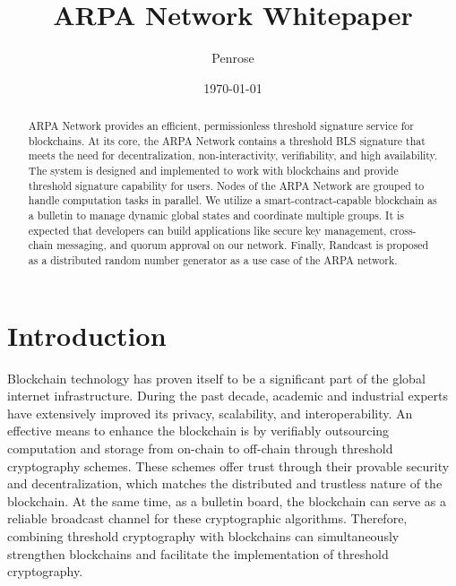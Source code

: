 \documentclass[11pt]{article}
\title{ARPA Network Whitepaper}
\author{Penrose}
\date{\today}
\begin{document}
\maketitle

\begin{abstract}
ARPA Network provides an efficient, permissionless threshold signature service for blockchains. At its core, the ARPA Network contains a threshold BLS signature that meets the need for decentralization, non-interactivity, verifiability, and high availability. The system is designed and implemented to work with blockchains and provide threshold signature capability for users. Nodes of the ARPA Network are grouped to handle computation tasks in parallel. We utilize a smart-contract-capable blockchain as a bulletin to manage dynamic global states and coordinate multiple groups. It is expected that developers can build applications like secure key management, cross-chain messaging, and quorum approval on our network. Finally, Randcast is proposed as a distributed random number generator as a use case of the ARPA network. 

\end{abstract}

\section{Introduction}
Blockchain technology has proven itself to be a significant part of the global internet infrastructure. During the past decade, academic and industrial experts have extensively improved its privacy, scalability, and interoperability. An effective means to enhance the blockchain is by verifiably outsourcing computation and storage from on-chain to off-chain through threshold cryptography schemes. These schemes offer trust through their provable security and decentralization, which matches the distributed and trustless nature of the blockchain. At the same time, as a bulletin board, the blockchain can serve as a reliable broadcast channel for these cryptographic algorithms. Therefore, combining threshold cryptography with blockchains can simultaneously strengthen blockchains and facilitate the implementation of threshold cryptography.
\end{document}
